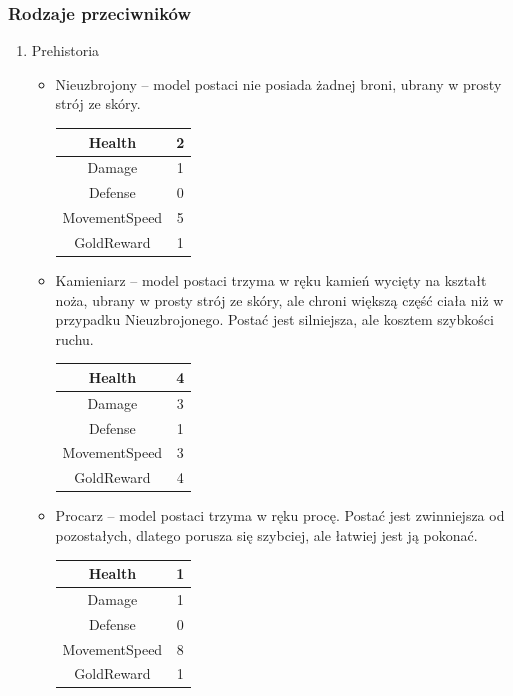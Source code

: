 \documentclass[a4paper,12pt, twoside, titlepage]{article}
\begin{document}
\subsubsection{Rodzaje przeciwników}
\begin{enumerate}
	\item Prehistoria
	\begin{itemize}
		\item Nieuzbrojony -- model postaci nie posiada żadnej broni, ubrany w prosty strój ze skóry.
		\begin{longtable}[l]{|c|c|} 
			\hline
			Health & 2 \\
			\hline
			Damage & 1 \\ 
			\hline 
			Defense & 0 \\ 
			\hline
			MovementSpeed & 5 \\ 
			\hline
			GoldReward & 1 \\ 
			\hline
		\end{longtable}
		
		\item Kamieniarz -- model postaci trzyma w ręku kamień wycięty na kształt noża, ubrany w prosty strój ze skóry, ale chroni większą część ciała niż w przypadku Nieuzbrojonego. Postać jest silniejsza, ale kosztem szybkości ruchu.
		\begin{longtable}[l]{|c|c|} 
			\hline
			Health & 4 \\
			\hline
			Damage & 3 \\ 
			\hline 
			Defense & 1 \\ 
			\hline
			MovementSpeed & 3 \\ 
			\hline
			GoldReward & 4 \\ 
			\hline
		\end{longtable}
	
		\item Procarz -- model postaci trzyma w ręku procę. Postać jest zwinniejsza od pozostałych, dlatego porusza się szybciej, ale łatwiej jest ją pokonać.
		\begin{longtable}[l]{|c|c|} 
			\hline
			Health & 1 \\
			\hline
			Damage & 1 \\ 
			\hline 
			Defense & 0 \\ 
			\hline
			MovementSpeed & 8 \\ 
			\hline
			GoldReward & 1 \\ 
			\hline
		\end{longtable}
		
	\end{itemize}
	

\end{enumerate}
\end{document}
